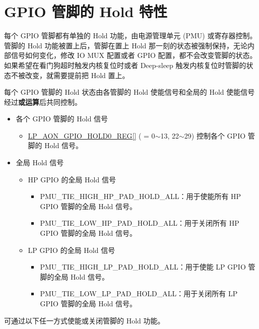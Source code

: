 \documentclass[main\_\_CN.tex]{subfiles}
\begin{document}
\section{GPIO 管脚的 Hold 特性}\label{sec:pad-hold}

每个 GPIO 管脚都有单独的 Hold 功能，由电源管理单元 (PMU) 或寄存器控制。管脚的 Hold 功能被置上后，管脚在置上 Hold 那一刻的状态被强制保持，无论内部信号如何变化，修改 IO MUX 配置或者 GPIO 配置，都不会改变管脚的状态。如果希望在看门狗超时触发内核复位时或者 Deep-sleep 触发内核复位时管脚的状态不被改变，就需要提前把 Hold 置上。

每个 GPIO 管脚的 Hold 状态由各管脚的 Hold 使能信号和全局的 Hold 使能信号经过\textbf{或运算}后共同控制。
\begin{itemize}
    \item 各个 GPIO 管脚的 Hold 信号
    \begin{itemize}
        \item \hyperref[regdesc:LPAONGPIOHOLD0REG]{LP\_AON\_GPIO\_HOLD0\_REG[]} ( = 0$\sim$13, 22$\sim$29) 控制各个 GPIO 管脚的 Hold 信号。
        \end{itemize}
    \item 全局 Hold 信号
        \begin{itemize}
            \item HP GPIO 的全局 Hold 信号
            \begin{itemize}
                \item PMU\_TIE\_HIGH\_HP\_PAD\_HOLD\_ALL：用于使能所有 HP GPIO 管脚的全局 Hold 信号。
                \item PMU\_TIE\_LOW\_HP\_PAD\_HOLD\_ALL：用于关闭所有 HP GPIO 管脚的全局 Hold 信号。
            \end{itemize}
            \item LP GPIO 的全局 Hold 信号
            \begin{itemize}
                \item PMU\_TIE\_HIGH\_LP\_PAD\_HOLD\_ALL：用于使能 LP GPIO 管脚的全局 Hold 信号。
                \item PMU\_TIE\_LOW\_LP\_PAD\_HOLD\_ALL：用于关闭所有 LP GPIO 管脚的全局 Hold 信号。
            \end{itemize}
        \end{itemize}
    \end{itemize}

可通过以下任一方式使能或关闭管脚的 Hold 功能。
\end{document}

